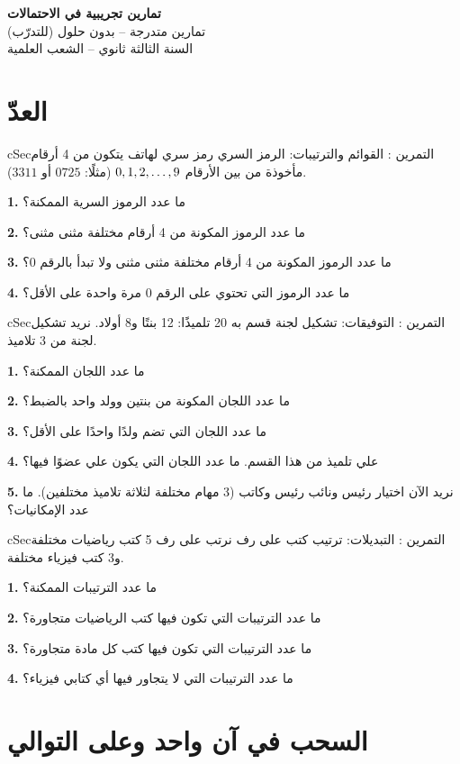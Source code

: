 \documentclass[12pt,a4paper]{article}
\newenvironment{BOX}[2]{\begin{otherlanguage}{english}\begin{arbox}{#1}{#2}}{\end{arbox}\end{otherlanguage}}
\newcounter{exo}
\newenvironment{tamrin}[1]{\stepcounter{exo}\begin{BOX}{cSec}{التمرين \theexo: #1}}{\end{BOX}}
\newenvironment{LTR}{\begin{otherlanguage}{english}}{\end{otherlanguage}}
\renewcommand{\ldots}{\mathinner{\ldotp\ldotp\ldotp}}
\newcommand{\QQ}[1]{\par\smallskip\textbf{#1.} }
\begin{document}
\begin{LTR}
\begin{tcolorbox}[enhanced,colback=cSec,colframe=cSec,arc=3mm,halign=center,boxrule=0pt,top=12pt,bottom=12pt,before upper={\selectlanguage{arabic}}]
{\color{white}\fontsize{26}{32}\selectfont\bfseries تمارين تجريبية في الاحتمالات}\\[8pt]
{\color{white}\large تمارين متدرجة -- بدون حلول (للتدرّب)}\\[5pt]
{\color{white}\large السنة الثالثة ثانوي -- الشعب العلمية}
\end{tcolorbox}
\end{LTR}
\section{العدّ}

\begin{tamrin}{القوائم والترتيبات: الرمز السري}
رمز سري لهاتف يتكون من 4 أرقام مأخوذة من بين الأرقام $0,1,2,\ldots,9$ (مثلًا: $0725$ أو $3311$).
\QQ{1} ما عدد الرموز السرية الممكنة؟
\QQ{2} ما عدد الرموز المكونة من 4 أرقام مختلفة مثنى مثنى؟
\QQ{3} ما عدد الرموز المكونة من 4 أرقام مختلفة مثنى مثنى ولا تبدأ بالرقم $0$؟
\QQ{4} ما عدد الرموز التي تحتوي على الرقم $0$ مرة واحدة على الأقل؟
\end{tamrin}

\begin{tamrin}{التوفيقات: تشكيل لجنة}
قسم به 20 تلميذًا: 12 بنتًا و8 أولاد. نريد تشكيل لجنة من 3 تلاميذ.
\QQ{1} ما عدد اللجان الممكنة؟
\QQ{2} ما عدد اللجان المكونة من بنتين وولد واحد بالضبط؟
\QQ{3} ما عدد اللجان التي تضم ولدًا واحدًا على الأقل؟
\QQ{4} علي تلميذ من هذا القسم. ما عدد اللجان التي يكون علي عضوًا فيها؟
\QQ{5} نريد الآن اختيار رئيس ونائب رئيس وكاتب (3 مهام مختلفة لثلاثة تلاميذ مختلفين). ما عدد الإمكانيات؟
\end{tamrin}

\begin{tamrin}{التبديلات: ترتيب كتب على رف}
نرتب على رف 5 كتب رياضيات مختلفة و3 كتب فيزياء مختلفة.
\QQ{1} ما عدد الترتيبات الممكنة؟
\QQ{2} ما عدد الترتيبات التي تكون فيها كتب الرياضيات متجاورة؟
\QQ{3} ما عدد الترتيبات التي تكون فيها كتب كل مادة متجاورة؟
\QQ{4} ما عدد الترتيبات التي لا يتجاور فيها أي كتابي فيزياء؟
\end{tamrin}

\section{السحب في آن واحد وعلى التوالي}
\end{document}
